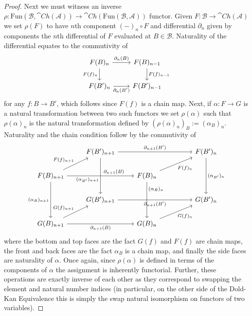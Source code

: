 \begin{proof}
    Next we must witness an inverse $\rho:\text{Fun}(\mathcal{B},\cat{Ch}(\mathcal{A}))\rightarrow \cat{Ch}(\text{Fun}(\mathcal{B},\mathcal{A}))$ functor. Given $F:\mathcal{B}\rightarrow \cat{Ch}(\mathcal{A})$ we set $\rho(F)$ to have $n$th component $(-)_n\circ F$ and differential $\partial_n$ given by components the $n$th differential of $F$ evaluated at $B  \in \mathcal{B}$. Naturality of the differential equates to the commutivity of 
    \[\begin{tikzcd}
    	{F(B)_n} & {F(B)_{n-1}} \\
    	{F(B')_n} & {F(B')_{n-1}}
    	\arrow["{F(f)_n}"', from=1-1, to=2-1]
    	\arrow["{\partial_n(B)}", from=1-1, to=1-2]
    	\arrow["{\partial_n(B')}"', from=2-1, to=2-2]
    	\arrow["{F(f)_{n-1}}", from=1-2, to=2-2]
    \end{tikzcd}\]
    for any $f:B\rightarrow B'$, which follows since $F(f)$ is a chain map. Next, if $\alpha:F\rightarrow G$ is a natural transformation between two such functors we set $\rho(\alpha)$ such that $\rho(\alpha)_n$ is the natural transformation defined by $(\rho(\alpha)_n)_B := (\alpha_B)_n$. Naturality and the chain condition follow by the commutivity of 
    \[\begin{tikzcd}
    	& {F(B')_{n+1}} &&& {F(B')_n} \\
    	{F(B)_{n+1}} && {F(B)_n} \\
    	& {G(B')_{n+1}} &&& {G(B')_n} \\
    	{G(B)_{n+1}} && {G(B)_n}
    	\arrow["{\partial_{n+1}(B)}"{pos=0.7}, from=2-1, to=2-3]
    	\arrow["{(\alpha_B)_{n+1}}"', from=2-1, to=4-1]
    	\arrow["{\partial_{n+1}(B)}"', from=4-1, to=4-3]
    	\arrow["{(\alpha_B)_n}"{pos=0.2}, from=2-3, to=4-3]
    	\arrow["{F(f)_{n+1}}", from=2-1, to=1-2]
    	\arrow["{F(f)_n}"', from=2-3, to=1-5]
    	\arrow["{\partial_{n+1}(B')}", from=1-2, to=1-5]
    	\arrow["{(\alpha_{B'})_n}", from=1-5, to=3-5]
    	\arrow["{G(f)_n}"', from=4-3, to=3-5]
    	\arrow["{G(f)_{n+1}}", from=4-1, to=3-2]
    	\arrow["{(\alpha_{B'})_{n+1}}"'{pos=0.6}, from=1-2, to=3-2]
    	\arrow["{\partial_{n+1}(B')}"', from=3-2, to=3-5]
    \end{tikzcd}\]
    where the bottom and top faces are the fact $G(f)$ and $F(f)$ are chain maps, the front and back faces are the fact $\alpha_B$ is a chain map, and finally the side faces are naturality of $\alpha$. Once again, since $\rho(\alpha)$ is defined in terms of the components of $\alpha$ the assignment is inherently functorial. Further, these operations are exactly inverse of each other as they correspond to swapping the element and natural number indices (in particular, on the other side of the Dold-Kan Equivalence this is simply the swap natural isomorphism on functors of two variables).
\end{proof}

